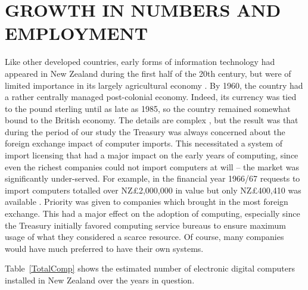 \documentclass{IEEEcsmag}
\begin{document}
\vspace*{-8pt}
\section{GROWTH IN NUMBERS AND EMPLOYMENT}
Like other developed countries, early forms of information technology had appeared in New Zealand during the first half of the 20th century, but were of limited importance in its largely agricultural economy \cite{pioneers}.
By 1960, the country had a rather centrally managed post-colonial economy. Indeed, its currency was tied to the pound sterling until as late as 1985, so the country remained somewhat bound to the British economy. The details are complex \cite{Sullivan2013}, but the result was that during the period of our study the Treasury was always concerned about the foreign exchange impact of computer imports. This necessitated a
system of import licensing that had a major impact on the early years of computing, since even the richest companies could not import computers at will -- the market was significantly under-served.
For example, in the financial year 1966/67 requests to import computers totalled over NZ£2,000,000 in value but only NZ£400,410 was available \cite{Treasury-1966}. Priority was given to companies which brought in the most foreign exchange. This had a major effect on the adoption of computing, especially since the Treasury initially favored computing service bureaus to ensure maximum usage of what they considered a scarce resource. Of course, many companies would have much preferred to have their own systems.

Table~\ref{TotalComp} shows the estimated number of electronic digital computers installed in New Zealand over the years in question.
\end{document}
